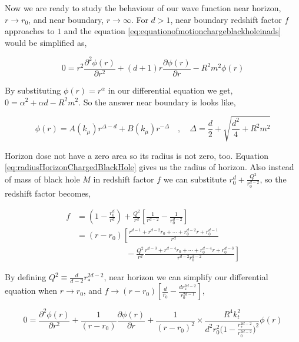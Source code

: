 Now we are ready to study the behaviour of our wave function near horizon, $r \rightarrow r_0$, and near boundary, $r \rightarrow \infty$. For $d > 1$, near boundary redshift factor $f$ approaches to $1$ and the equation \ref{eq:equationofmotionchargeblackholeinads} would be simplified as,

\begin{equation}
    0 = r^2\frac{\partial^2\phi(r)}{\partial r^2} + (d+1)r\frac{\partial \phi(r)}{\partial r} - R^2m^2\phi(r)
\end{equation}

By substituting $\phi(r) = r^\alpha$ in our differential equation we get, $0 = \alpha^2 + \alpha d -R^2m^2$. So the answer near boundary is looks like,

\begin{equation}
    \phi(r) = A(k_\mu)r^{\Delta-d} + B(k_\mu)r^{-\Delta} \quad , \quad \Delta = \frac{d}{2} + \sqrt{\frac{d^2}{4} + R^2m^2}
\end{equation}

Horizon dose not have a zero area so its radius is not zero, too. Equation \ref{eq:radiusHorizonChargedBlackHole} gives us the radius of horizon. Also instead of mass of black hole $M$ in redshift factor $f$ we can substitute $r^d_0 + \frac{Q^2}{r^{d-2}_0}$, so the redshift factor becomes,

\begin{align} \label{eq:redshiftfactorr0r*}
    f &= (1 - \frac{r^d_0}{r^d}) + \frac{Q^2}{r^d}\left[\frac{1}{r^{d-2}} - \frac{1}{r^{d-2}_0} \right] \\
      &= (r-r_0) \left[ \frac{r^{d-1} + r^{d-2}r_0 + \cdots + r^{d-2}_0r + r^{d-1}_0 }{r^d} \right. \nonumber\\
      & \qquad \qquad \qquad - \left. \frac{Q^2}{r^d}\frac{r^{d-3} + r^{d-4}r_0 + \cdots + r^{d-4}_0r + r^{d-3}_0}{r^{d-2}r^{d-2}_0} \right]
\end{align}

By defining $Q^2 \equiv \frac{d}{d-2}r^{2d-2}_*$, near horizon we can simplify our differential equation when $r \rightarrow r_0$, and $f \rightarrow (r-r_0)\left[\frac{d}{r_0} - \frac{dr^{2d-2}_*}{r^{2d-1}_0} \right]$,

\begin{equation}
    0 = \frac{\partial^2 \phi(r)}{\partial r^2} + \frac{1}{(r-r_0)}\frac{\partial \phi(r)}{\partial r} + \frac{1}{(r-r_0)^2} \times \frac{R^4k^2_t}{d^2r_0^2 \big(1-\frac{r^{2d-2}_*}{r^{2d-2}_0}\big)^2}\phi(r)
\end{equation}

